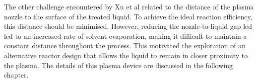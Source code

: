 The other challenge encountered by Xu et al related to the distance of the plasma nozzle to the surface of the treated liquid. To achieve the ideal reaction efficiency, this distance should be minimised. However, reducing the nozzle-to-liquid gap led led to an increased rate of solvent evaporation, making it difficult to maintain a constant distance throughout the process. This  motivated the exploration of an alternative reactor design that allows the liquid to remain in closer proximity to the plasma. The details of this plasma device are discussed in the following chapter.






